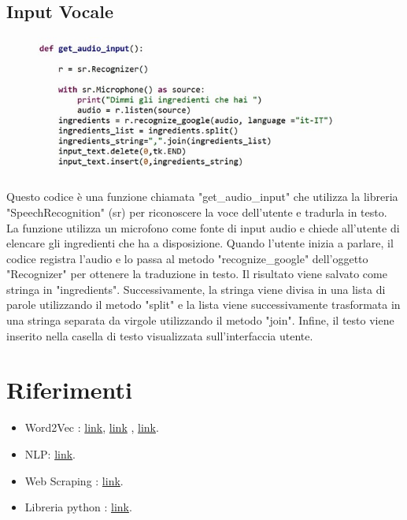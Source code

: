 \documentclass[12pt]{report}
\begin{document}
\section{Input Vocale}   
\begin{figure}[H]
        \centering
        {\includegraphics[width=0.9\textwidth]{img/img20.jpg}}
\end{figure}

Questo codice è una funzione chiamata "get\_audio\_input" che utilizza la libreria "SpeechRecognition" (sr) per riconoscere la voce dell'utente e tradurla in testo. La funzione utilizza un microfono come fonte di input audio e chiede all'utente di elencare gli ingredienti che ha a disposizione. Quando l'utente inizia a parlare, il codice registra l'audio e lo passa al metodo "recognize\_google" dell'oggetto "Recognizer" per ottenere la traduzione in testo. Il risultato viene salvato come stringa in "ingredients". Successivamente, la stringa viene divisa in una lista di parole utilizzando il metodo "split" e la lista viene successivamente trasformata in una stringa separata da virgole utilizzando il metodo "join". Infine, il testo viene inserito nella casella di testo visualizzata sull'interfaccia utente.

\chapter{Riferimenti}

\begin{itemize}
\item Word2Vec  : \href{http://nadbordrozd.github.io/blog/2016/05/20/text-classification-with-word2vec/}{link}, \href{https://github.com/TomLin/Playground/blob/master/04-Model-Comparison-Word2vec-Doc2vec-TfIdfWeighted.ipynb}{link} , \href{https://towardsdatascience.com/an-introduction-to-word2vec-in-nlp-854e1c288894}{link}.
\item NLP: \href{https://towardsdatascience.com/nlp-performance-of-different-word-embeddings-on-text-classification-de648c6262b}{link}.
\item Web Scraping : \href{https://realpython.com/beautiful-soup-web-scraper-python/}{link}.
\item Libreria python : \href{ https://github.com/hhursev/recipe-scrapers}{link}.
\end{itemize}
\end{document}
